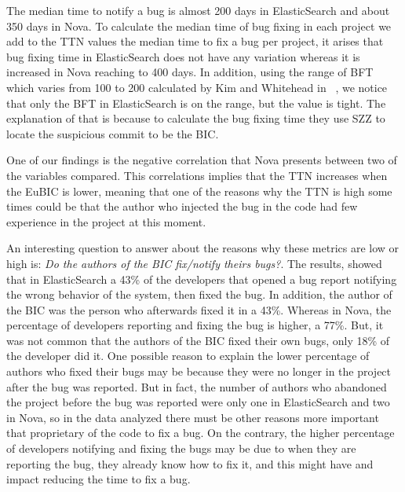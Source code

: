 \documentclass[10pt, conference]{IEEEtran}
\begin{document}
The median time to notify a bug is almost 200 days in ElasticSearch and about 350 days in Nova. To calculate the median time of bug fixing in each project we add to the TTN values the median time to fix a bug per project, it arises that bug fixing time in ElasticSearch does not have any variation whereas it is increased in Nova reaching to 400 days. In addition, using the range of BFT which varies from 100 to 200 calculated by Kim and Whitehead in ~\cite{kim2006long}, we notice that only the BFT in ElasticSearch is on the range, but the value is tight. The explanation of that is because to calculate the bug fixing time they use SZZ to locate the suspicious commit to be the BIC.

\vspace{0.2cm}
\vspace{0.1cm}

One of our findings is the negative correlation that Nova presents between two of the variables compared. This correlations implies that the TTN increases when the EuBIC is lower, meaning that one of the reasons why the TTN is high some times could be that the author who injected the bug in the code had few experience in the project at this moment.

\vspace{0.2cm}
\vspace{0.1cm}


An interesting question to answer about the reasons why these metrics are low or high is: \emph{Do the authors of the BIC fix/notify theirs bugs?}. The results, showed that in ElasticSearch a 43\% of the developers that opened a bug report notifying the wrong behavior of the system, then fixed the bug. In addition, the author of the BIC was the person who afterwards fixed it in a 43\%. Whereas in Nova, the percentage of developers reporting and fixing the bug is higher, a 77\%. But, it was not common that the authors of the BIC fixed their own bugs, only 18\% of the developer did it. One possible reason to explain the lower percentage of authors who fixed their bugs may be because they were no longer in the project after the bug was reported. But in fact, the number of authors who abandoned the project before the bug was reported were only one in ElasticSearch and two in Nova, so in the data analyzed there must be other reasons more important that proprietary of the code to fix a bug. On the contrary, the higher percentage of developers notifying and fixing the bugs may be due to when they are reporting the bug, they already know how to fix it, and this might have and impact reducing the time to fix a bug. 
\end{document}
